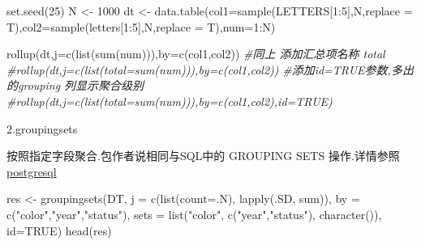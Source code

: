 \documentclass[
]{book}
\newenvironment{Shaded}{\begin{snugshade}}{\end{snugshade}}
\newcommand{\AttributeTok}[1]{\textcolor[rgb]{0.77,0.63,0.00}{#1}}
\newcommand{\CommentTok}[1]{\textcolor[rgb]{0.56,0.35,0.01}{\textit{#1}}}
\newcommand{\ConstantTok}[1]{\textcolor[rgb]{0.00,0.00,0.00}{#1}}
\newcommand{\DecValTok}[1]{\textcolor[rgb]{0.00,0.00,0.81}{#1}}
\newcommand{\FunctionTok}[1]{\textcolor[rgb]{0.00,0.00,0.00}{#1}}
\newcommand{\NormalTok}[1]{#1}
\newcommand{\OtherTok}[1]{\textcolor[rgb]{0.56,0.35,0.01}{#1}}
\newcommand{\SpecialCharTok}[1]{\textcolor[rgb]{0.00,0.00,0.00}{#1}}
\newcommand{\StringTok}[1]{\textcolor[rgb]{0.31,0.60,0.02}{#1}}
\begin{document}
\begin{Shaded}
\begin{Highlighting}[]
\FunctionTok{set.seed}\NormalTok{(}\DecValTok{25}\NormalTok{)}
\NormalTok{N }\OtherTok{\textless{}{-}} \DecValTok{1000}
\NormalTok{dt }\OtherTok{\textless{}{-}} \FunctionTok{data.table}\NormalTok{(}\AttributeTok{col1=}\FunctionTok{sample}\NormalTok{(LETTERS[}\DecValTok{1}\SpecialCharTok{:}\DecValTok{5}\NormalTok{],N,}\AttributeTok{replace =}\NormalTok{ T),}\AttributeTok{col2=}\FunctionTok{sample}\NormalTok{(letters[}\DecValTok{1}\SpecialCharTok{:}\DecValTok{5}\NormalTok{],N,}\AttributeTok{replace =}\NormalTok{ T),}\AttributeTok{num=}\DecValTok{1}\SpecialCharTok{:}\NormalTok{N)}

\FunctionTok{rollup}\NormalTok{(dt,}\AttributeTok{j=}\FunctionTok{c}\NormalTok{(}\FunctionTok{list}\NormalTok{(}\FunctionTok{sum}\NormalTok{(num))),}\AttributeTok{by=}\FunctionTok{c}\NormalTok{(}\StringTok{\textquotesingle{}col1\textquotesingle{}}\NormalTok{,}\StringTok{\textquotesingle{}col2\textquotesingle{}}\NormalTok{))}
\CommentTok{\#同上 添加汇总项名称 total}
\CommentTok{\#rollup(dt,j=c(list(total=sum(num))),by=c(\textquotesingle{}col1\textquotesingle{},\textquotesingle{}col2\textquotesingle{}))}
\CommentTok{\#添加id=TRUE参数,多出的grouping 列显示聚合级别}
\CommentTok{\#rollup(dt,j=c(list(total=sum(num))),by=c(\textquotesingle{}col1\textquotesingle{},\textquotesingle{}col2\textquotesingle{}),id=TRUE)}
\end{Highlighting}
\end{Shaded}

2.groupingsets

按照指定字段聚合.包作者说相同与SQL中的 GROUPING SETS 操作.详情参照\href{http://www.postgresql.org/docs/9.5/static/queries-table-expressions.html\#QUERIES-GROUPING-SETS}{postgresql}

\begin{Shaded}
\begin{Highlighting}[]
\NormalTok{res }\OtherTok{\textless{}{-}} \FunctionTok{groupingsets}\NormalTok{(DT, }\AttributeTok{j =} \FunctionTok{c}\NormalTok{(}\FunctionTok{list}\NormalTok{(}\AttributeTok{count=}\NormalTok{.N), }\FunctionTok{lapply}\NormalTok{(.SD, sum)), }\AttributeTok{by =} \FunctionTok{c}\NormalTok{(}\StringTok{"color"}\NormalTok{,}\StringTok{"year"}\NormalTok{,}\StringTok{"status"}\NormalTok{),}
             \AttributeTok{sets =} \FunctionTok{list}\NormalTok{(}\StringTok{"color"}\NormalTok{, }\FunctionTok{c}\NormalTok{(}\StringTok{"year"}\NormalTok{,}\StringTok{"status"}\NormalTok{), }\FunctionTok{character}\NormalTok{()), }\AttributeTok{id=}\ConstantTok{TRUE}\NormalTok{)}
\FunctionTok{head}\NormalTok{(res)}
\end{Highlighting}
\end{Shaded}
\end{document}
